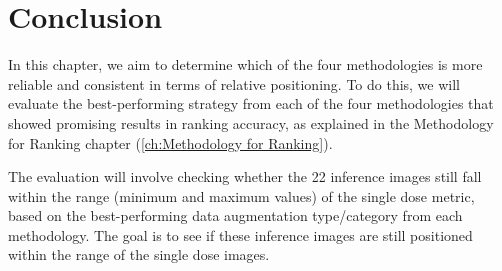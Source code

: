 \chapter{Conclusion}
In this chapter, we aim to determine which of the four methodologies is more reliable and consistent in terms of relative positioning. To do this, we will evaluate the best-performing strategy from each of the four methodologies that showed promising results in ranking accuracy, as explained in the Methodology for Ranking chapter (\ref{ch:Methodology for Ranking}).

The evaluation will involve checking whether the 22 inference images still fall within the range (minimum and maximum values) of the single dose metric, based on the best-performing data augmentation type/category from each methodology. The goal is to see if these inference images are still positioned within the range of the single dose images.

